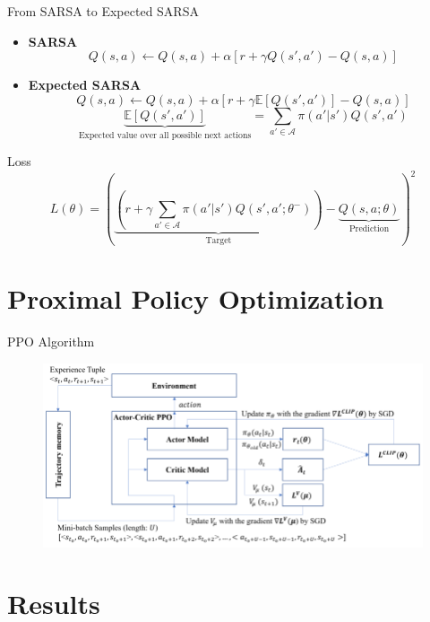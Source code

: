 \documentclass[serif]{beamer}  %
\begin{document}
\begin{frame}{From SARSA to Expected SARSA}
    \begin{itemize}
        \item \textbf{SARSA}
        $$Q(s, a) \leftarrow Q(s, a) + \alpha \left[ r + \gamma Q(s', a') - Q(s, a) \right]$$
        \item \textbf{Expected SARSA}
        $$Q(s, a) \leftarrow Q(s, a) + \alpha \left[ r + \gamma \mathbb{E}[Q(s', a')] - Q(s, a) \right]$$
        $$\underbrace{\mathbb{E}[Q(s', a')]}_{\text{Expected value over all possible next actions}} = \sum_{a' \in \mathcal{A}} \pi(a'|s') Q(s', a')$$
    \end{itemize}
\end{frame}

\begin{frame}{Loss}
$$L(\theta) = \left( \underbrace{\left( r + \gamma \sum_{a' \in \mathcal{A}} \pi(a'|s') Q(s', a'; \theta^-) \right)}_{\text{Target}} - \underbrace{Q(s, a; \theta)}_{\text{Prediction}} \right)^2$$
\end{frame}

\section{Proximal Policy Optimization}

\begin{frame}{PPO Algorithm}
    \begin{figure}
        \centering
        \includegraphics[width=\linewidth]{images/PPO_diagram.png}
    \end{figure}
\end{frame}

\section{Results}
\end{document}
